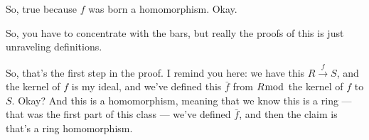 \begin{proofWrapper}
\begin{speech}[01:01:06 - 01:01:57]
So, true because $f$ was born a homomorphism. Okay.
\end{speech}

\begin{speech}[01:01:57 - 01:02:41]
So, you have to concentrate with the bars, but really the proofs of this is just unraveling definitions. 

So, that's the first step in the proof. I remind you here: we have this $R \xrightarrow{f} S$,  and the kernel of $f$ is my ideal,  and we've defined this $\bar{f}$ from $R \bmod$ the kernel of $f$ to $S$.  Okay? And this is a homomorphism,  meaning that we know this is a ring --- that was the first part of this class --- we've defined $\bar{f}$, and then the claim is that's a ring homomorphism.
\end{speech}

\begin{content}


\end{content}
\end{proofWrapper}
